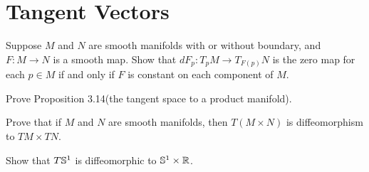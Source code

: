 \chapter{Tangent Vectors}

\begin{problem}
    Suppose $M$ and $N$ are smooth manifolds with or without boundary, and $F \colon M \to N$ is a smooth map. Show that $dF_p \colon T_pM \to T_{F(p)}N$ is the zero map for each $p \in M$ if and only if $F$ is constant on each component of $M$.
\end{problem}

\begin{problem}
    Prove Proposition 3.14(the tangent space to a product manifold).
\end{problem}

\begin{problem}
    Prove that if $M$ and $N$ are smooth manifolds, then $T(M \times N)$ is diffeomorphism to $TM \times TN$.
\end{problem}

\begin{problem}
    Show that $T\mathbb{S}^1$ is diffeomorphic to $\mathbb{S}^1 \times \mathbb{R}$.
\end{problem}